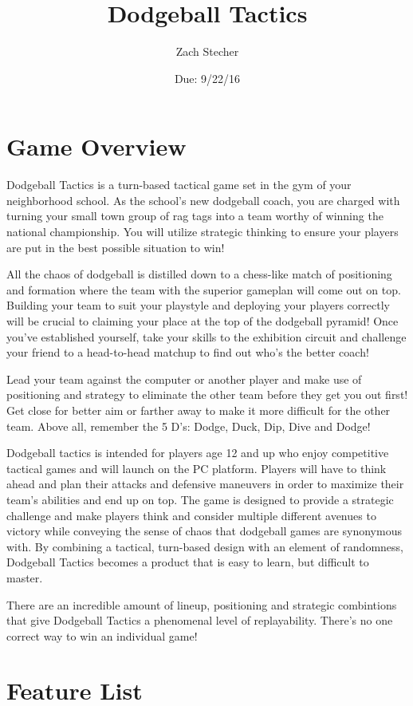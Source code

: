 \documentclass [12pt]{article}
\title{{\Huge \textbf{Dodgeball Tactics}}}
\author{Zach Stecher}
\date{Due: 9/22/16}
\begin{document}
\maketitle
\newpage

\section*{Game Overview}
Dodgeball Tactics is a turn-based tactical game set in the gym of your neighborhood school. As the school's new dodgeball coach, you are charged with turning your small town group of rag tags into a team worthy of winning the national championship. You will utilize strategic thinking to ensure your players are put in the best possible situation to win!

All the chaos of dodgeball is distilled down to a chess-like match of positioning and formation where the team with the superior gameplan will come out on top. Building your team to suit your playstyle and deploying your players correctly will be crucial to claiming your place at the top of the dodgeball pyramid! Once you've established yourself, take your skills to the exhibition circuit and challenge your friend to a head-to-head matchup to find out who's the better coach!

Lead your team against the computer or another player and make use of positioning and strategy to eliminate the other team before they get you out first! Get close for better aim or farther away to make it more difficult for the other team. Above all, remember the 5 D's: Dodge, Duck, Dip, Dive and Dodge!

Dodgeball tactics is intended for players age 12 and up who enjoy competitive tactical games and will launch on the PC platform. Players will have to think ahead and plan their attacks and defensive maneuvers in order to maximize their team's abilities and end up on top. The game is designed to provide a strategic challenge and make players think and consider multiple different avenues to victory while conveying the sense of chaos that dodgeball games are synonymous with. By combining a tactical, turn-based design with an element of randomness, Dodgeball Tactics becomes a product that is easy to learn, but difficult to master.

There are an incredible amount of lineup, positioning and strategic combintions that give Dodgeball Tactics a phenomenal level of replayability. There's no one correct way to win an individual game!
\newpage

\section*{Feature List}
\end{document}
